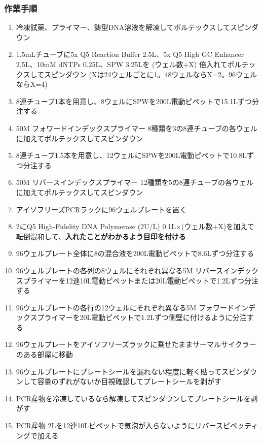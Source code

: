 \documentclass[titlepage,10pt,a4paper,uplatex]{jsbook}
\renewcommand{\textbf}[1]{{\bfseries\sffamily#1}}
\begin{document}
\subsubsection{作業手順}
\begin{enumerate}
\item 冷凍試薬、プライマー、鋳型DNA溶液を解凍してボルテックスしてスピンダウン
\item 1.5mLチューブに5x Q5 Reaction Buffer 2.5{\textmu}L、5x Q5 High GC Enhancer 2.5{\textmu}L、10mM dNTPs 0.25{\textmu}L、SPW 3.25{\textmu}Lを (ウェル数+X) 倍入れてボルテックスしてスピンダウン (Xは24ウェルごとに1。48ウェルならX=2。96ウェルならX=4)
\item 8連チューブ1本を用意し、8ウェルにSPWを200{\textmu}L電動ピペットで15.1{\textmu}Lずつ分注する
\item 50{\textmu}M フォワードインデックスプライマー 8種類を3の8連チューブの各ウェルに加えてボルテックスしてスピンダウン
\item 8連チューブ1.5本を用意し、12ウェルにSPWを200{\textmu}L電動ピペットで10.8{\textmu}Lずつ分注する
\item 50{\textmu}M リバースインデックスプライマー 12種類を5の8連チューブの各ウェルに加えてボルテックスしてスピンダウン
\item アイソフリーズPCRラックに96ウェルプレートを置く
\item 2にQ5 High-Fidelity DNA Polymerase (2U/{\textmu}L) 0.1{\textmu}L×(ウェル数+X)を加えて転倒混和して、\textbf{入れたことがわかるよう目印を付ける}
\item 96ウェルプレート全体に8の混合液を200{\textmu}L電動ピペットで8.6{\textmu}Lずつ分注する
\item 96ウェルプレートの各列の8ウェルにそれぞれ異なる5{\textmu}M リバースインデックスプライマーを12連10{\textmu}L電動ピペットまたは20{\textmu}L電動ピペットで1.2{\textmu}Lずつ分注する
\item 96ウェルプレートの各行の12ウェルにそれぞれ異なる5{\textmu}M フォワードインデックスプライマーを20{\textmu}L電動ピペットで1.2{\textmu}Lずつ側壁に付けるように分注する
\item 96ウェルプレートをアイソフリーズラックに乗せたままサーマルサイクラーのある部屋に移動
\item 96ウェルプレートにプレートシールを漏れない程度に軽く貼ってスピンダウンして容量のずれがないか目視確認してプレートシールを剥がす
\item PCR産物を冷凍しているなら解凍してスピンダウンしてプレートシールを剥がす
\item PCR産物 2{\textmu}Lを12連10{\textmu}Lピペットで気泡が入らないようにリバースピペッティングで加える

\end{enumerate}
\end{document}
